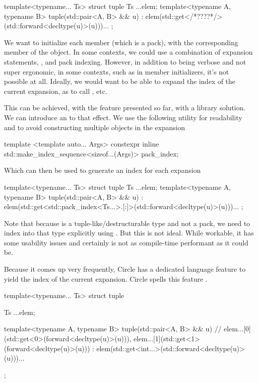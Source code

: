 \documentclass{wg21}
\begin{document}
\begin{colorblock}
template<typename... Ts>
struct tuple {
    Ts ...elem;
    template<typename A, typename B>
    tuple(std::pair<A, B> && u)
    : elem(std::get</*????*/>(std::forward<decltype(u)>(u)))... { }
};
\end{colorblock}

We want to initialize each member  (which is a pack), with the corresponding member of the  object.
In some contexts, we could use a combination of expansion statements, , and pack indexing.
However, in addition to being verbose and not super ergonomic, in some contexts, such as in member initializers, it's not possible at all.
Ideally, we would want to be able to expand the index of the current expansion, as to call , etc.

This can be achieved, with the feature presented so far, with a library solution.
We can introduce an  to that effect. We use the following utility for readability and to avoid constructing multiple objects in the expansion

\begin{colorblock}
template <template auto... Args>
constexpr inline std::make_index_sequence<sizeof...(Args)> pack_index;
\end{colorblock}

Which can then be used to generate an index for each expansion

\begin{colorblock}
template<typename... Ts>
struct tuple {
    Ts ...elem;
    template<typename A, typename B>
    tuple(std::pair<A, B> && u)
    : elem(std::get<std::pack_index<Ts...>.[:]>(std::forward<decltype(u)>(u)))... { }
};
\end{colorblock}

Note that because  is a tuple-like/destructurable type and not a pack, we need to index into that type explicitly using .
But this is not ideal. While workable, it has some usability issues and certainly is not as compile-time performant as it could be.

Because it comes up very frequently, Circle has a dedicated language feature to yield the index of the current expansion.
Circle spells this feature .

\begin{colorblock}
template<typename... Ts>
struct tuple {
Ts ...elem;

template<typename A, typename B>
tuple(std::pair<A, B> && u)
 // elem...[0](std::get<0>(forward<decltype(u)>(u))), elem...[1](std::get<1>(forward<decltype(u)>(u)))
: elem(std::get<int...>(std::forward<decltype(u)>(u)))...
{ }
};
\end{colorblock}
\end{document}
